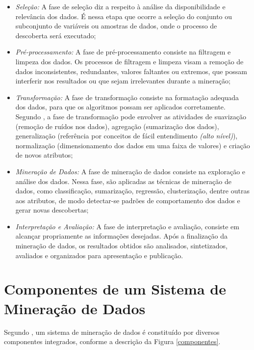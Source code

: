 \begin{itemize}
\item \textit{Seleção:} A fase de seleção diz a respeito à análise da disponibilidade e relevância dos dados. É nessa etapa que ocorre a seleção do conjunto ou subconjunto de variáveis ou amostras de dados, onde o processo de descoberta será executado;

\item \textit{Pré-processamento:} A fase de pré-processamento consiste na filtragem e limpeza dos dados. Os processos de filtragem e limpeza visam a remoção de dados inconsistentes, redundantes, valores faltantes ou extremos, que possam interferir nos resultados ou que sejam irrelevantes durante a mineração; 

\item \textit{Transformação:} A fase de transformação consiste na formatação  adequada dos dados, para que os algoritmos possam ser aplicados corretamente. Segundo \citet{han_kamber2006}, a fase de transformação pode envolver as atividades de suavização (remoção de ruídos nos dados),  agregação (sumarização dos dados), generalização (referência por conceitos de fácil entendimento \textit{(alto nível)}), normalização (dimensionamento dos dados em uma faixa de valores) e criação de novos atributos;

\item \textit{Mineração de Dados:} A fase de mineração de dados consiste na exploração e análise dos dados. Nessa fase, são aplicadas as técnicas de mineração de dados, como classificação, sumarização, regressão, clusterização, dentre outras aos atributos, de modo detectar-se padrões de comportamento dos dados e gerar novas descobertas; 

\item \textit{Interpretação e Avaliação:} A fase de interpretação e avaliação, consiste em alcançar propriamente as informações desejadas. Após a finalização da mineração de dados, os resultados obtidos são analisados, sintetizados, avaliados e organizados para apresentação e publicação. 
\end{itemize}

\section{Componentes de um Sistema de Mineração de Dados} \label{3title2}

Segundo \citet{han_kamber2006}, um sistema de mineração de dados é constituído por diversos componentes integrados, conforme a descrição da Figura \ref{componentes}.

